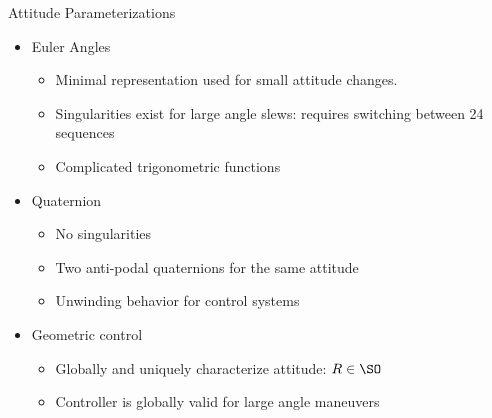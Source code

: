 \begin{frame}[noframenumbering]{Attitude Parameterizations}
\label{slide:attitude_parameterizations}
    \begin{itemize}
        \item Euler Angles
        \begin{itemize}
            \item Minimal representation used for small attitude changes.
            \item Singularities exist for large angle slews: requires switching between 24 sequences
            \item Complicated trigonometric functions
        \end{itemize}
        \pause
        \vs
        \item Quaternion 
        \begin{itemize}
            \item No singularities
            \item Two anti-podal quaternions for the same attitude
            \item Unwinding behavior for control systems
        \end{itemize}
        \pause
        \vs
        \item Geometric control
        \begin{itemize}
            \item Globally and uniquely characterize attitude: \( R \in \SO \)
            \item Controller is globally valid for large angle maneuvers
        \end{itemize}
    \end{itemize}

\end{frame}

